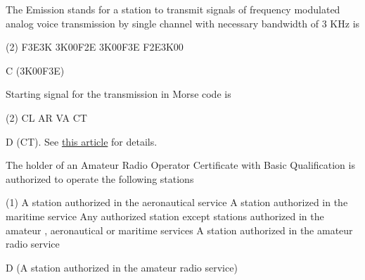 \documentclass[a4paper]{article}
\begin{document}
\vspace{5mm}



\begin{question}The Emission stands for a station to transmit signals of frequency modulated analog voice transmission by single channel with necessary bandwidth of 3 KHz is
	\begin{tasks}(2)
		\task F3E3K
		\task 3K00F2E
		\task 3K00F3E
		\task F2E3K00
	\end{tasks}
\end{question}

\begin{solution}
	C (3K00F3E)
\end{solution}

\vspace{5mm}



\begin{question}Starting signal for the transmission in Morse code is
	\begin{tasks}(2)
		\task CL
		\task AR
		\task VA
		\task CT
	\end{tasks}
\end{question}

\begin{solution}
	D (CT). See \href{https://en.wikipedia.org/wiki/Prosigns_for_Morse_code}{this article} for details.
\end{solution}

\vspace{5mm}



\begin{question}The holder of an Amateur Radio Operator Certificate with Basic Qualification is authorized to operate the following stations
	\begin{tasks}(1)
		\task A station authorized in the aeronautical service
		\task A station authorized in the maritime service
		\task Any authorized station except stations authorized in the amateur , aeronautical or maritime services
		\task A station authorized in the amateur radio service
	\end{tasks}
\end{question}

\begin{solution}
	D (A station authorized in the amateur radio service)
\end{solution}

\vspace{5mm}
\end{document}
